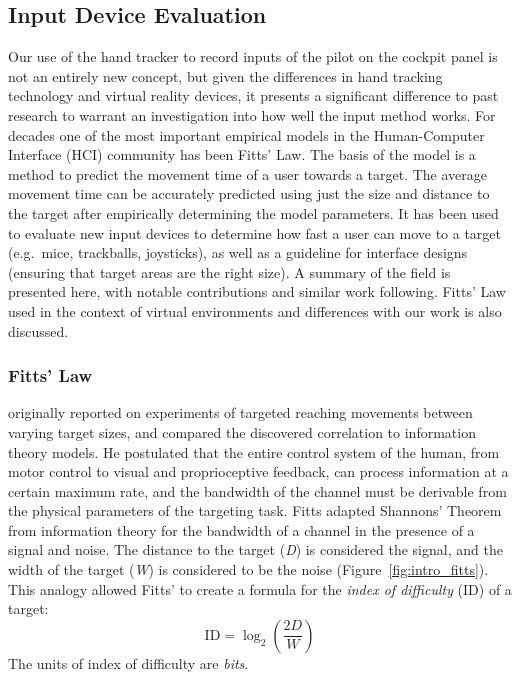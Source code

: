 \subsection{Input Device Evaluation}
\label{input-device-evaluation}

Our use of the hand tracker to record inputs of the pilot on the cockpit panel is not an entirely new concept, but given the differences in hand tracking technology and virtual reality devices, it presents a significant difference to past research to warrant an investigation into how well the input method works.
For decades one of the most important empirical models in the Human-Computer Interface (HCI) community has been Fitts' Law.
The basis of the model is a method to predict the movement time of a user towards a target.
The average movement time can be accurately predicted using just the size and distance to the target after empirically determining the model parameters.
It has been used to evaluate new input devices to determine how fast a user can move to a target (e.g.\ mice, trackballs, joysticks), as well as a guideline for interface designs (ensuring that target areas are the right size).
A summary of the field is presented here, with notable contributions and similar work following.
Fitts' Law used in the context of virtual environments and differences with our work is also discussed.

\subsubsection{Fitts' Law}
\label{fitts-law}

\citet{fitts_information_1954} originally reported on experiments of targeted reaching movements between varying target sizes, and compared the discovered correlation to information theory models.
He postulated that the entire control system of the human, from motor control to visual and proprioceptive feedback, can process information at a certain maximum rate, and the bandwidth of the channel must be derivable from the physical parameters of the targeting task.
Fitts adapted Shannons' Theorem \citep{shannon_communication_1949} from information theory for the bandwidth of a channel in the presence of a signal and noise.
The distance to the target (\emph{D}) is considered the signal, and the width of the target (\emph{W}) is considered to be the noise (Figure~\ref{fig:intro_fitts}).
This analogy allowed Fitts' to create a formula for the \emph{index of difficulty} (\(\text{ID}\)) of a target:
\begin{equation}
    \mathrm{ID} = \log_2\left(\frac{2D}{W}\right)
    \label{eq:intro_id}
\end{equation}
The units of index of difficulty are \emph{bits}.

